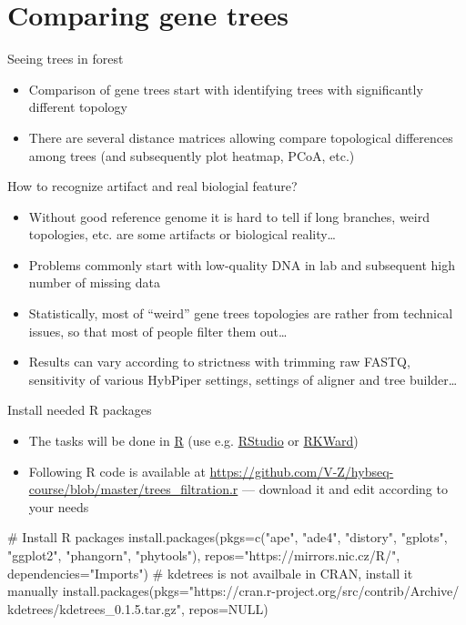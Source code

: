 \documentclass[compress,  xelatex, 11pt, xcolor=x11names, aspectratio=169,
	hyperref={
		bookmarks=true,
		unicode=true,
		colorlinks=true,
		pdftitle={HybSeq course},
		plainpages=false,
		pdfauthor={Vojtech Zeisek},
		pdfsubject={Practical processing of HybSeq target enrichment sequencing data on computing grids like MetaCentrum},
		pdfcreator={XeLaTeX},
		pdfkeywords={BASH, command line, GNU, HybSeq, Linux, MetaCentrum, sequencing shell, target enrichment},
		linkcolor=Turquoise4, %
		anchorcolor=DodgerBlue4, %
		citecolor=DodgerBlue4, %
		filecolor=DodgerBlue4, %
		menucolor=Tan4, %
		urlcolor=DarkOliveGreen4 %
		},
	url={hyphens, lowtilde} %
	]{beamer}
\begin{document}
\section{Comparing gene trees}

\begin{frame}{Seeing trees in forest}
	\begin{itemize}
		\item Comparison of gene trees start with identifying trees with significantly different topology
		\item There are several distance matrices allowing compare topological differences among trees (and subsequently plot heatmap, PCoA, etc.)
	\end{itemize}
	\begin{block}{How to recognize artifact and real biologial feature?}
		\begin{itemize}
			\item Without good reference genome it is hard to tell if long branches, weird topologies, etc. are some artifacts or biological reality\ldots
			\item Problems commonly start with low-quality DNA in lab and subsequent high number of missing data
			\item Statistically, most of \enquote{weird} gene trees topologies are rather from technical issues, so that most of people filter them out\ldots
			\item Results can vary according to strictness with trimming raw FASTQ, sensitivity of various HybPiper settings, settings of aligner and tree builder\ldots
		\end{itemize}
	\end{block}
\end{frame}

\begin{frame}[fragile]{Install needed R packages}
	\begin{itemize}
		\item The tasks will be done in \href{https://www.r-project.org/}{R} (use e.g. \href{https://posit.co/products/open-source/rstudio/}{RStudio} or \href{https://rkward.kde.org/}{RKWard})
		\item Following R code is available at \url{https://github.com/V-Z/hybseq-course/blob/master/trees_filtration.r} --- download it and edit according to your needs
	\end{itemize}
	\begin{spluscode}
    # Install R packages
    install.packages(pkgs=c("ape", "ade4", "distory", "gplots", "ggplot2",
      "phangorn", "phytools"), repos="https://mirrors.nic.cz/R/",
      dependencies="Imports")
    # kdetrees is not availbale in CRAN, install it manually
    install.packages(pkgs="https://cran.r-project.org/src/contrib/Archive/
      kdetrees/kdetrees_0.1.5.tar.gz", repos=NULL)
	\end{spluscode}
\end{frame}
\end{document}
